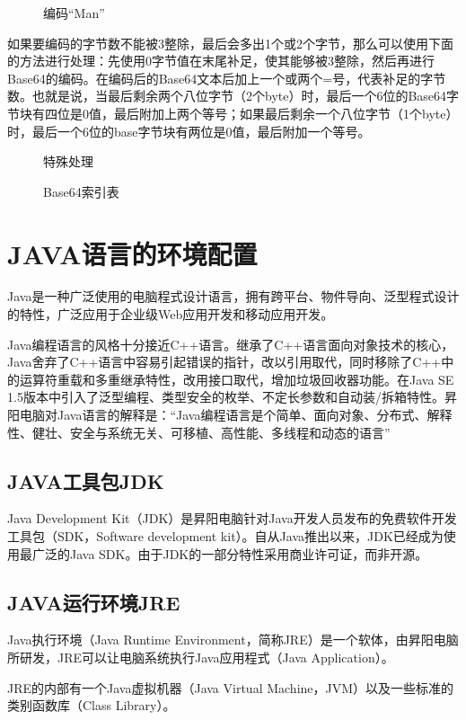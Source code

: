 \documentclass[bachelor]{thesis-uestc}
\begin{document}
\begin{figure}[h]
\caption{编码“Man”}
\end{figure}

如果要编码的字节数不能被3整除，最后会多出1个或2个字节，那么可以使用下面的方法进行处理：先使用0字节值在末尾补足，使其能够被3整除，然后再进行Base64的编码。在编码后的Base64文本后加上一个或两个=号，代表补足的字节数。也就是说，当最后剩余两个八位字节（2个byte）时，最后一个6位的Base64字节块有四位是0值，最后附加上两个等号；如果最后剩余一个八位字节（1个byte）时，最后一个6位的base字节块有两位是0值，最后附加一个等号。

\begin{figure}[h]
\caption{特殊处理}
\end{figure}

\begin{figure}[h]
\caption{Base64索引表}
\end{figure}

\section{JAVA语言的环境配置}
Java是一种广泛使用的电脑程式设计语言，拥有跨平台、物件导向、泛型程式设计的特性，广泛应用于企业级Web应用开发和移动应用开发。
\par Java编程语言的风格十分接近C++语言。继承了C++语言面向对象技术的核心，Java舍弃了C++语言中容易引起错误的指针，改以引用取代，同时移除了C++中的运算符重载和多重继承特性，改用接口取代，增加垃圾回收器功能。在Java SE 1.5版本中引入了泛型编程、类型安全的枚举、不定长参数和自动装/拆箱特性。昇阳电脑对Java语言的解释是：“Java编程语言是个简单、面向对象、分布式、解释性、健壮、安全与系统无关、可移植、高性能、多线程和动态的语言”

\subsection{JAVA工具包JDK}
Java Development Kit（JDK）是昇阳电脑针对Java开发人员发布的免费软件开发工具包（SDK，Software development kit）。自从Java推出以来，JDK已经成为使用最广泛的Java SDK。由于JDK的一部分特性采用商业许可证，而非开源。

\subsection{JAVA运行环境JRE}
Java执行环境（Java Runtime Environment，简称JRE）是一个软体，由昇阳电脑所研发，JRE可以让电脑系统执行Java应用程式（Java Application）。
\par JRE的内部有一个Java虚拟机器（Java Virtual Machine，JVM）以及一些标准的类别函数库（Class Library）。
\end{document}
